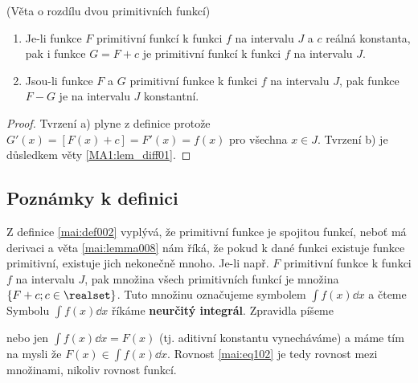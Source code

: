     \begin{mdframed}[style=mdmathlemma] 
      \begin{lemma}\label{mai:lemma008}(Věta o rozdílu dvou primitivních funkcí)
        \begin{enumerate}[noitemsep]
          \item Je-li funkce $F$ primitivní funkcí k funkci \(f\) na intervalu \(J\) a \(c\) reálná  
                konstanta, pak i funkce $G = F + c$ je primitivní funkcí k funkci \(f\) na intervalu 
                \(J\).
          \item Jsou-li funkce $F$ a $G$ primitivní funkce k funkci \(f\) na intervalu \(J\), pak 
          funkce
                $F-G$ je na intervalu \(J\) konstantní.
        \end{enumerate} 
        \begin{proof}
          Tvrzení a) plyne z definice protože $G'(x) = [F(x) + c] = F'(x) = f(x)$ pro všechna $x\in
          J$. Tvrzení b) je důsledkem věty \ref{MA1:lem_diff01}.
        \end{proof}
      \end{lemma}
    \end{mdframed}

    \subsection{Poznámky k definici}  
      Z definice \ref{mai:def002} vyplývá, že primitivní funkce je spojitou funkcí, neboť má
      derivaci a věta \ref{mai:lemma008} nám říká, že pokud k dané funkci existuje funkce
      primitivní, existuje jich nekonečně mnoho. Je-li např. \(F\) primitivní funkce k funkci \(f\)
      na intervalu \(J\), pak množina všech primitivních funkcí je množina \(\{F + c;
      c\in\realset\}\). Tuto množinu označujeme symbolem \(\int f(x)\dd{x}\) a čteme  Symbolu \(\int f(x)\dd{x}\) říkáme \textbf{neurčitý integrál}. Zpravidla
      píšeme
      \begin{mdframed}[style=mdeq]
        \begin{luaequ}\label{mai:eq102}
        \end{luaequ}
      \end{mdframed}
      nebo jen \(\int f(x)\dd{x} = F(x)\) (tj. aditivní konstantu vynecháváme) a máme tím na mysli
      že \(F(x) \in \int f(x)\dd{x}\). Rovnost \ref{mai:eq102} je tedy rovnost mezi množinami,
      nikoliv rovnost funkcí. 
    
